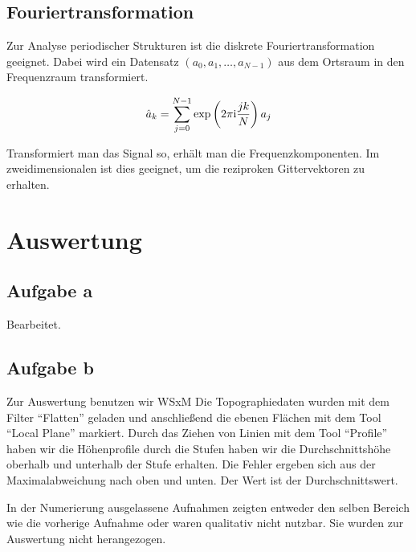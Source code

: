 \documentclass[a4paper,german,12pt,smallheadings]{scrartcl}
\begin{document}
\subsection{Fouriertransformation}

Zur Analyse periodischer Strukturen ist die diskrete Fouriertransformation
geeignet. Dabei wird ein Datensatz $(a_0, a_1, \dots, a_{N-1})$ aus dem Ortsraum in
den Frequenzraum transformiert.

\begin{equation}
  \hat{a}_k = \sum_{j=0}^{N-1} \exp\del{2 \pi \text{i} \frac{jk}{N}} a_j
\end{equation}

Transformiert man das Signal so, erhält man die Frequenzkomponenten. Im
zweidimensionalen ist dies geeignet, um die reziproken Gittervektoren zu
erhalten.

\section{Auswertung}

\subsection{Aufgabe a}

Bearbeitet.

\subsection{Aufgabe b}

Zur Auswertung benutzen wir WSxM\cite{wsxm}
Die Topographiedaten wurden mit dem Filter ``Flatten'' geladen und anschließend
die ebenen Flächen mit dem Tool ``Local Plane'' markiert. Durch das Ziehen von
Linien mit dem Tool ``Profile'' haben wir die Höhenprofile durch die Stufen
haben wir die Durchschnittshöhe oberhalb und unterhalb der Stufe erhalten. Die
Fehler ergeben sich aus der Maximalabweichung nach oben und unten. Der Wert ist
der Durchschnittswert.

In der Numerierung ausgelassene Aufnahmen zeigten entweder den selben Bereich
wie die vorherige Aufnahme oder waren qualitativ nicht nutzbar. Sie wurden zur
Auswertung nicht herangezogen.
\end{document}
